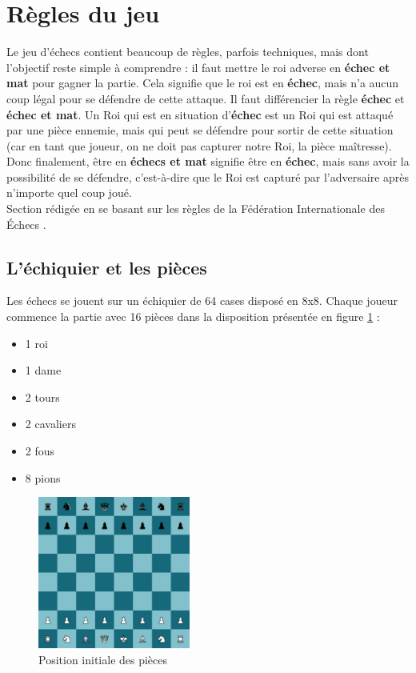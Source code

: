 \documentclass{article}
\begin{document}
\section{Règles du jeu}
Le jeu d'échecs contient beaucoup de règles, parfois techniques, mais dont l'objectif reste simple à comprendre :
il faut mettre le roi adverse en \textbf{échec et mat} pour gagner la partie. Cela signifie que le roi est en \textbf{échec},
mais n'a aucun coup légal pour se défendre de cette attaque. Il faut différencier la règle \textbf{échec} et 
\textbf{échec et mat}. Un Roi qui est en situation d'\textbf{échec} est un Roi qui est attaqué par une pièce
ennemie, mais qui peut se défendre pour sortir de cette situation (car en tant que joueur, on ne doit pas capturer notre Roi,
la pièce maîtresse). Donc finalement, être en \textbf{échecs et mat} signifie être en \textbf{échec}, mais sans avoir
la possibilité de se défendre, c'est-à-dire que le Roi est capturé par l'adversaire après n'importe quel coup joué.\\
Section rédigée en se basant sur les règles de la Fédération Internationale des Échecs \cite{FIDE2021}.

\subsection{L'échiquier et les pièces}
Les échecs se jouent sur un échiquier de 64 cases disposé en 8x8. Chaque joueur commence la partie avec 16 pièces dans la disposition présentée en figure \ref{init} :
\begin{itemize}
    \item 1 roi
    \item 1 dame
    \item 2 tours
    \item 2 cavaliers
    \item 2 fous
    \item 8 pions
\end{itemize}

\begin{figure}[h]
    \centering
    \includegraphics[width=\textwidth,height=5.0cm,keepaspectratio]{jeuDepart.png}
    \caption{Position initiale des pièces}
    \label{init}
\end{figure}
\end{document}
